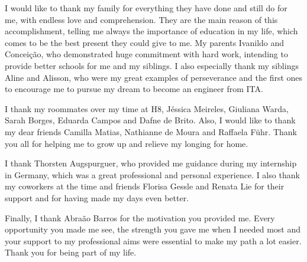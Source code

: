 	I would like to thank my family for everything they have done and still do for me, with endless love and comprehension. They are the main reason of this accomplishment, telling me always the importance of education in my life, which comes to be the best present they could give to me. My parents Ivanildo and Concei\c{c}{\~a}o, who demonstrated huge commitment with hard work, intending to provide better schools for me and my siblings. I also especially thank my siblings Aline and Alisson, who were my great examples of perseverance and the first ones to encourage me to pursue my dream to become an engineer from ITA.

	I thank my roommates over my time at H8, J\'essica Meireles, Giuliana Warda, Sarah Borges, Eduarda Campos and Dafne de Brito. Also, I would like to thank my dear friends Camilla Matias, Nathianne de Moura and Raffaela F\"uhr. Thank you all for helping me to grow up and relieve my longing for home.

	I thank Thorsten Augspurguer, who provided me guidance during my internship in Germany, which was a great professional and personal experience. I also thank my coworkers at the time and friends Florisa Gessle and Renata Lie for their support and for having made my days even better.

	Finally, I thank Abra{\~a}o Barros for the motivation you provided me. Every opportunity you made me see, the strength you gave me when I needed most and your support to my professional aims were essential to make my path a lot easier. Thank you for being part of my life.